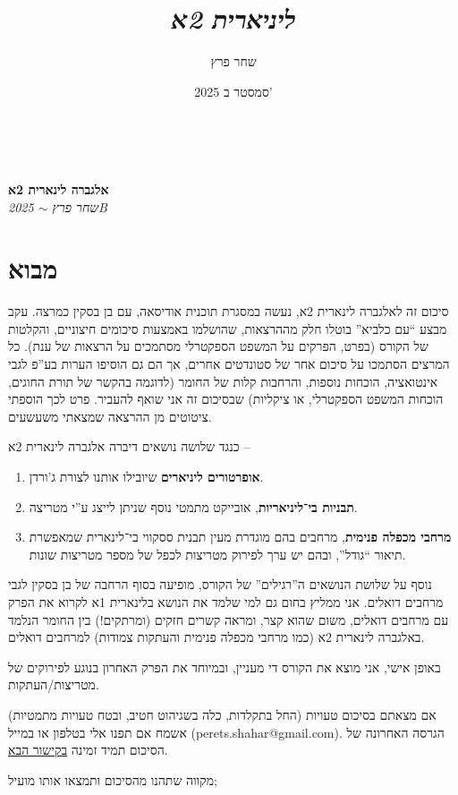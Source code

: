 \documentclass[a4paper]{article}
\author{שחר פרץ}
\title{\textit{ליניארית 2א}}
\date{2025 סמסטר ב'}
\theoremstyle{definition}
\begin{document}
	\,\!
	
	{\vspace{0.5\textheight-2em} {\begin{center} {\textbf{{אלגברה לינארית 2א}} \\ \textit{שחר פרץ $\sim$ 2025B}} \end{center}}}
	
	\newpage
	\section*{\Large מבוא}
	סיכום זה לאלגברה לינארית 2א, נעשה במסגרת תוכנית אודיסאה, עם בן בסקין כמרצה. עקב מבצע ``עם כלביא'' בוטלו חלק מההרצאות, שהושלמו באמצעות סיכומים חיצוניים, והקלטות של הקורס (בפרט, הפרקים על המשפט הספקטרלי מסתמכים על הרצאות של ענת). כל המרצים הסתמכו על סיכום אחר של סטונדטים אחרים, אך הם גם הוסיפו הערות בע''פ לגבי אינטואציה, הוכחות נוספות, והרחבות קלות של החומר (לדוגמה בהקשר של תורת החוגים, הוכחות המשפט הספקטרלי, או ציקליות) שבסיכום זה אני שואף להעביר. פרט לכך הוספתי ציטוטים מן ההרצאה שמצאתי משעשעים. 
	
	כנגד שלושה נושאים דיברה אלגברה לינארית 2א –
	\begin{enumerate}
		\item \textbf{אופרטורים ליניארים} שיובילו אותנו לצורת ג'ורדן. 
		\item \textbf{תבניות בי־ליניאריות}, אובייקט מתמטי נוסף שניתן לייצג ע''י מטריצה. 
		\item \textbf{מרחבי מכפלה פנימית}, מרחבים בהם מוגדרת מעין תבנית ססקווי בי־לינארית שמאפשרת תיאור ``גודל'', ובהם יש ערך לפירוק מטריצות לכפל של מספר מטריצות שונות. 
	\end{enumerate}
	
	נוסף על שלושת הנושאים ה''רגילים'' של הקורס, מופיעה בסוף הרחבה של בן בסקין לגבי מרחבים דואלים. אני ממליץ בחום גם למי שלמד את הנושא בלינארית 1א לקרוא את הפרק עם מרחבים דואלים, משום שהוא קצר, ומראה קשרים חזקים (ומרתקים!) בין החומר הנלמד באלגברה לינארית 2א (כמו מרחבי מכפלה פנימית והעתקות צמודות) למרחבים דואלים. 
	
	באופן אישי, אני מוצא את הקורס די מעניין, ובמיוחד את הפרק האחרון בנוגע לפירוקים של מטריצות/העתקות. 
	
	אם מצאתם בסיכום טעויות (החל בתקלדות, כלה בשגיהוט חטיב, ובטח טעויות מתמטיות) אשמח אם תפנו אלי בטלפון או במייל (perets.shahar@gmail.com). הגרסה האחרונה של הסיכום תמיד זמינה \href{https://github.com/Sh-Pe/cs-tau-shpe/tree/master/lin2A/megasum}{בקישור הבא}.  
	
	מקווה שתהנו מהסיכום ותמצאו אותו מועיל; 
	
\end{document}
